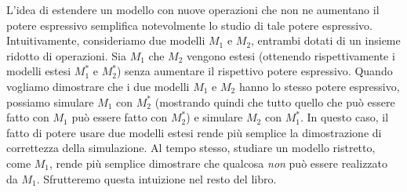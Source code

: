 
L'idea di estendere un modello con nuove operazioni che non ne aumentano il potere espressivo semplifica notevolmente lo
studio di tale potere espressivo.
Intuitivamente, consideriamo due modelli $M_{1}$ e $M_2$, entrambi dotati di un insieme ridotto di operazioni.
Sia $M_1$ che $M_2$ vengono estesi (ottenendo rispettivamente i modelli estesi $M_1^{*}$ e $M_2^{*}$) senza aumentare il
rispettivo potere espressivo.
Quando vogliamo dimostrare che i due modelli $M_1$ e $M_2$ hanno lo stesso potere espressivo, possiamo simulare $M_1$
con $M_2^{*}$ (mostrando quindi che tutto quello che può essere fatto con $M_1$ può essere fatto con $M_2^{*}$) e
simulare $M_2$ con $M_1^{*}$.
In questo caso, il fatto di potere usare due modelli estesi rende più semplice la dimostrazione di correttezza della simulazione.
Al tempo stesso, studiare un modello ristretto, come $M_1$, rende più semplice dimostrare che qualcosa \emph{non} può
essere realizzato da $M_1$.
Sfrutteremo questa intuizione nel resto del libro.


